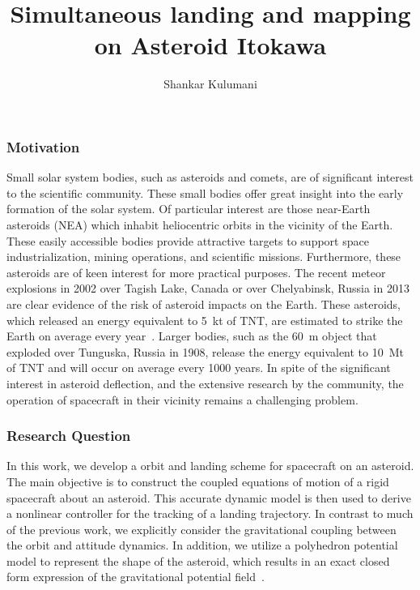 \documentclass[11pt,reqno,twocolumn]{article} %
\title{Simultaneous landing and mapping on Asteroid Itokawa}
\author{Shankar Kulumani}
\date{} %
\begin{document}
\maketitle
\subsubsection*{Motivation}
Small solar system bodies, such as asteroids and comets, are of significant interest to the scientific community.
These small bodies offer great insight into the early formation of the solar system.
Of particular interest are those near-Earth asteroids (NEA) which inhabit heliocentric orbits in the vicinity of the Earth.
These easily accessible bodies provide attractive targets to support space industrialization, mining operations, and scientific missions.
Furthermore, these asteroids are of keen interest for more practical purposes.
The recent meteor explosions in  2002 over Tagish Lake, Canada or over Chelyabinsk, Russia in 2013 are clear evidence of the risk of asteroid impacts on the Earth.
These asteroids, which released an energy equivalent to \SI{5}{\kilo\tonne} of TNT, are estimated to strike the Earth on average every year~\cite{brown2002}.
Larger bodies, such as the \SI{60}{\meter} object that exploded over Tunguska, Russia in 1908, release the energy equivalent to \SI{10}{\mega\tonne} of TNT and will occur on average every \num{1000} years.
In spite of the significant interest in asteroid deflection, and the extensive research by the community, the operation of spacecraft in their vicinity remains a challenging problem.

\subsubsection*{Research Question}
In this work, we develop a orbit and landing scheme for spacecraft on an asteroid.
The main objective is to construct the coupled equations of motion of a rigid spacecraft about an asteroid.
This accurate dynamic model is then used to derive a nonlinear controller for the tracking of a landing trajectory.
In contrast to much of the previous work, we explicitly consider the gravitational coupling between the orbit and attitude dynamics.
In addition, we utilize a polyhedron potential model to represent the shape of the asteroid, which results in an exact closed form expression of the gravitational potential field~\cite{werner1994,werner1996}.
\end{document}
